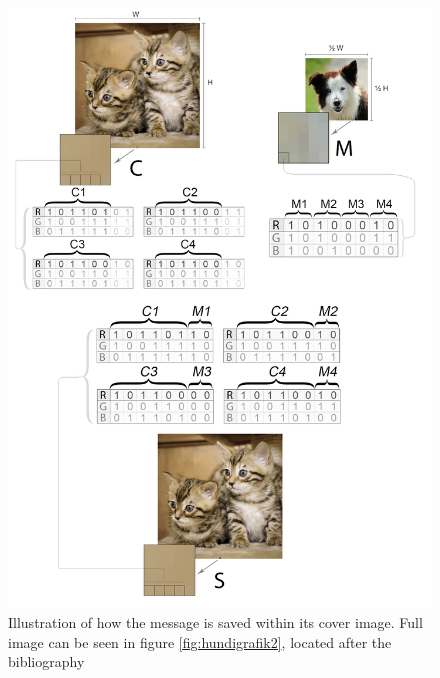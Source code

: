 \begin{figure}
	\centering
	\includegraphics[width=1\textwidth]{figures/hundikatgrafik2.png}
	\caption{Illustration of how the message is saved within its cover image. Full image can be seen in figure \ref{fig:hundigrafik2}, located after the bibliography}
	\label{fig:hundigrafik}
\end{figure}



